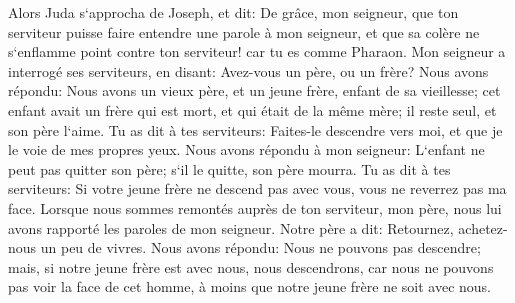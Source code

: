 \verse Alors Juda s`approcha de Joseph, et dit: De grâce, mon seigneur, que ton serviteur puisse faire entendre une parole à mon seigneur, et que sa colère ne s`enflamme point contre ton serviteur! car tu es comme Pharaon. 
\verse Mon seigneur a interrogé ses serviteurs, en disant: Avez-vous un père, ou un frère? 
\verse Nous avons répondu: Nous avons un vieux père, et un jeune frère, enfant de sa vieillesse; cet enfant avait un frère qui est mort, et qui était de la même mère; il reste seul, et son père l`aime. 
\verse Tu as dit à tes serviteurs: Faites-le descendre vers moi, et que je le voie de mes propres yeux. 
\verse Nous avons répondu à mon seigneur: L`enfant ne peut pas quitter son père; s`il le quitte, son père mourra. 
\verse Tu as dit à tes serviteurs: Si votre jeune frère ne descend pas avec vous, vous ne reverrez pas ma face. 
\verse Lorsque nous sommes remontés auprès de ton serviteur, mon père, nous lui avons rapporté les paroles de mon seigneur. 
\verse Notre père a dit: Retournez, achetez-nous un peu de vivres. 
\verse Nous avons répondu: Nous ne pouvons pas descendre; mais, si notre jeune frère est avec nous, nous descendrons, car nous ne pouvons pas voir la face de cet homme, à moins que notre jeune frère ne soit avec nous. 
